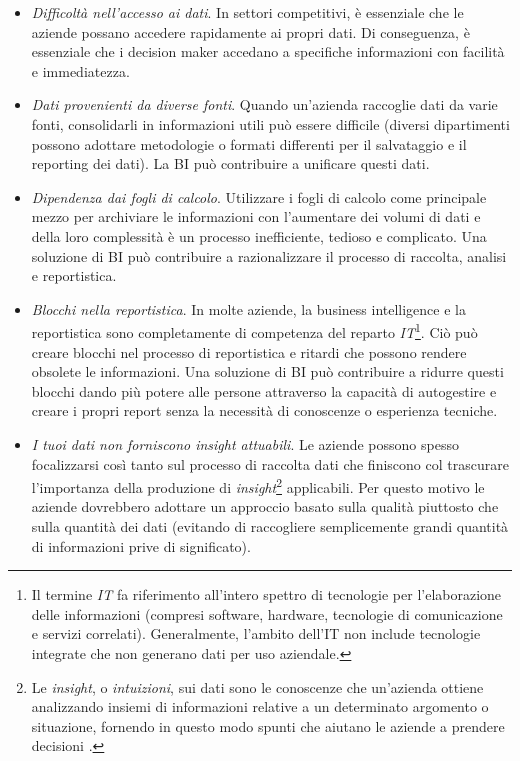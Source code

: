 \begin{itemize}
    \item \textit{Difficoltà nell'accesso ai dati}. In settori competitivi, è essenziale che le aziende possano accedere rapidamente ai propri dati. Di conseguenza, è essenziale che i decision maker accedano a specifiche informazioni con facilità e immediatezza.
    \item \textit{Dati provenienti da diverse fonti}. Quando un'azienda raccoglie dati da varie fonti, consolidarli in informazioni utili può essere difficile (diversi dipartimenti possono adottare metodologie o formati differenti per il salvataggio e il reporting dei dati). La BI può contribuire a unificare questi dati.
    \item \textit{Dipendenza dai fogli di calcolo}. Utilizzare i fogli di calcolo come principale mezzo per archiviare le informazioni con l'aumentare dei volumi di dati e della loro complessità è un processo inefficiente, tedioso e complicato. Una soluzione di BI può contribuire a razionalizzare il processo di raccolta, analisi e reportistica.
    \item \textit{Blocchi nella reportistica}. In molte aziende, la business intelligence e la reportistica sono completamente di competenza del reparto \textit{IT}\footnote{Il termine \textit{IT} fa riferimento all'intero spettro di tecnologie per l'elaborazione delle informazioni (compresi software, hardware, tecnologie di comunicazione e servizi correlati). Generalmente, l'ambito dell'IT non include tecnologie integrate che non generano dati per uso aziendale\cite{gartner_it}.}. Ciò può creare blocchi nel processo di reportistica e ritardi che possono rendere obsolete le informazioni. Una soluzione di BI può contribuire a ridurre questi blocchi dando più potere alle persone attraverso la capacità di autogestire e creare i propri report senza la necessità di conoscenze o esperienza tecniche.
    \item \textit{I tuoi dati non forniscono insight attuabili}. Le aziende possono spesso focalizzarsi così tanto sul processo di raccolta dati che finiscono col trascurare l'importanza della produzione di \textit{insight}\footnote{Le \textit{insight}, o \textit{intuizioni}, sui dati sono le conoscenze che un'azienda ottiene analizzando insiemi di informazioni relative a un determinato argomento o situazione, fornendo in questo modo spunti che aiutano le aziende a prendere decisioni \cite{datarobot_insight}.} applicabili. Per questo motivo le aziende dovrebbero adottare un approccio basato sulla qualità piuttosto che sulla quantità dei dati (evitando di raccogliere semplicemente grandi quantità di informazioni prive di significato).

\end{itemize}
